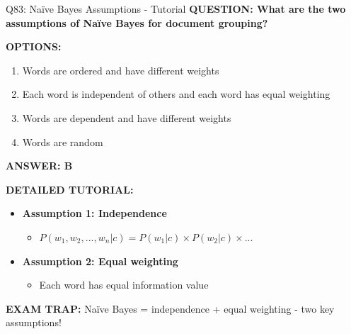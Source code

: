 \documentclass[8pt]{beamer}
\begin{document}
	\begin{frame}{Q83: Naïve Bayes Assumptions - Tutorial}
		\fontsize{6.5}{7.5}\selectfont
		\textbf{QUESTION: What are the two assumptions of Naïve Bayes for document grouping?}
		
		\vspace{0.1cm}
		\textbf{OPTIONS:}
		\begin{enumerate}
			\item Words are ordered and have different weights
			\item Each word is independent of others and each word has equal weighting
			\item Words are dependent and have different weights
			\item Words are random
		\end{enumerate}
		
		\vspace{0.1cm}
		\textcolor{myblue}{\textbf{ANSWER: B}}
		
		\vspace{0.1cm}
		\textbf{DETAILED TUTORIAL:}
		\begin{itemize}
			\item \textbf{Assumption 1: Independence}
			\begin{itemize}
				\item $P(w_1, w_2, ..., w_n|c) = P(w_1|c) \times P(w_2|c) \times ...$
			\end{itemize}
			\item \textbf{Assumption 2: Equal weighting}
			\begin{itemize}
				\item Each word has equal information value
			\end{itemize}
		\end{itemize}
		
		\textcolor{myred}{\textbf{EXAM TRAP:}} Naïve Bayes = \textcolor{myblue}{independence + equal weighting} - two key assumptions!
	\end{frame}
	
\end{document}
